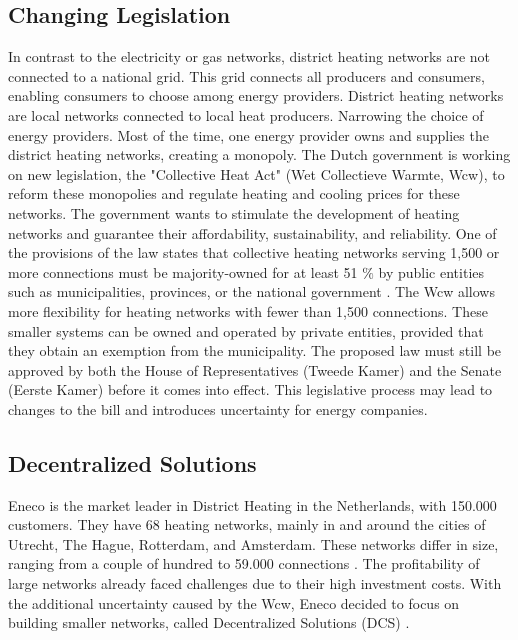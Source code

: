 \subsection{Changing Legislation}
In contrast to the electricity or gas networks, district heating networks are not connected to a national grid. This grid connects all producers and consumers, enabling consumers to choose among energy providers. District heating networks are local networks connected to local heat producers. Narrowing the choice of energy providers. Most of the time, one energy provider owns and supplies the district heating networks, creating a monopoly. The Dutch government is working on new legislation, the "Collective Heat Act" (Wet Collectieve Warmte, Wcw), to reform these monopolies and regulate heating and cooling prices for these networks. The government wants to stimulate the development of heating networks and guarantee their affordability, sustainability, and reliability. One of the provisions of the law states that collective heating networks serving 1,500 or more connections must be majority-owned for at least 51 $\%$ by public entities such as municipalities, provinces, or the national government \cite{WcWsite}. The Wcw allows more flexibility for heating networks with fewer than 1,500 connections. These smaller systems can be owned and operated by private entities, provided that they obtain an exemption from the municipality. The proposed law
must still be approved by both the House of Representatives (Tweede Kamer) and the Senate (Eerste Kamer) before it comes into effect. This legislative process may lead to changes to the bill and introduces uncertainty for energy companies.

\subsection{Decentralized Solutions}
Eneco is the market leader in District Heating in the Netherlands, with 150.000 customers. They have 68 heating networks, mainly in and around the cities of Utrecht, The Hague, Rotterdam, and Amsterdam. These networks differ in size, ranging from a couple of hundred to 59.000 connections \cite{warmtenetwerkenEneco}. The profitability of large networks already faced challenges due to their high investment costs. With the additional uncertainty caused by the Wcw, Eneco decided to focus on building smaller networks, called Decentralized Solutions (DCS) \cite{nos2025warmtenetten}. \\

